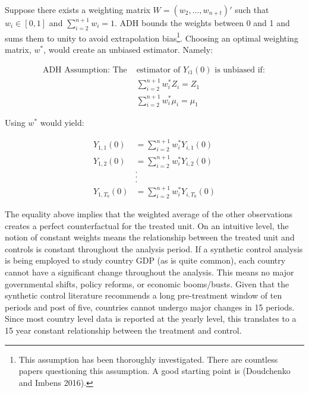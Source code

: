 \documentclass[
]{article}
\begin{document}
Suppose there exists a weighting matrix \(W=(w_2,...,w_{n+t})'\) such
that \(w_i \in [0,1]\) and \(\sum_{i=2}^{n+1} w_i=1\). ADH bounds the
weights between 0 and 1 and sums them to unity to avoid extrapolation
bias\footnote{This assumption has been thoroughly investigated. There
  are countless papers questioning this assumption. A good starting
  point is (Doudchenko and Imbens 2016).}. Choosing an optimal weighting
matrix, \(w^*\), would create an unbiased estimator. Namely:

\[\boxed{
\begin{aligned}
\text{ADH Assumption: The }& \text{estimator of $Y_{i1}(0)$ is unbiased if}:\\
&\sum_{i=2}^{n+1}w_i^*Z_i=Z_1\\
&\sum_{i=2}^{n+1}w_i^* \mu_i =\mu_1
\end{aligned}
}\]

Using \(w^*\) would yield:

\[
\begin{aligned}
Y_{1,1}(0)&=\sum_{i=2}^{n+1} w^*_i Y_{i,1}(0)\\
Y_{1,2}(0)&=\sum_{i=2}^{n+1} w^*_i Y_{i,2}(0)\\
&.\\
&.\\
&.\\
Y_{1,T_0}(0)&=\sum_{i=2}^{n+1} w^*_i Y_{i,T_0}(0)
\end{aligned}
\]

The equality above implies that the weighted average of the other
observations creates a perfect counterfactual for the treated unit. On
an intuitive level, the notion of constant weights means the
relationship between the treated unit and controls is constant
throughout the analysis period. If a synthetic control analysis is being
employed to study country GDP (as is quite common), each country cannot
have a significant change throughout the analysis. This means no major
governmental shifts, policy reforms, or economic booms/busts. Given that
the synthetic control literature recommends a long pre-treatment window
of ten periods and post of five, countries cannot undergo major changes
in 15 periods. Since most country level data is reported at the yearly
level, this translates to a 15 year constant relationship between the
treatment and control.
\end{document}
